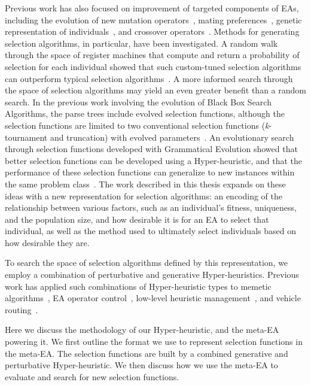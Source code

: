 \documentclass[times,12pt,titlepage]{mstogs}
\begin{document}
\begin{ThesisBody}
Previous work has also focused on improvement of targeted components of EAs, including the evolution of new mutation operators~\citep{woodward2012mutationGeneration, hong2013probMutation}, mating preferences~\citep{guntly2011limp}, genetic representation of individuals~\citep{scott2015geneticRepresentations}, and crossover operators~\citep{goldman2011scc}. Methods for generating selection algorithms, in particular, have been investigated. A random walk through the space of register machines that compute and return a probability of selection for each individual showed that such custom-tuned selection algorithms can outperform typical selection algorithms~\citep{woodward2011selection}. A more informed search through the space of selection algorithms may yield an even greater benefit than a random search. In the previous work involving the evolution of Black Box Search Algorithms, the parse trees include evolved selection functions, although the selection functions are limited to two conventional selection functions (\textit{k}-tournament and truncation) with evolved parameters~\citep{martin2013evolvingBBSA}. An evolutionary search through selection functions developed with Grammatical Evolution showed that better selection functions can be developed using a Hyper-heuristic, and that the performance of these selection functions can generalize to new instances within the same problem class~\citep{lourencco2013selection}. The work described in this thesis expands on these ideas with a new representation for selection algorithms: an encoding of the relationship between various factors, such as an individual's fitness, uniqueness, and the population size, and how desirable it is for an EA to select that individual, as well as the method used to ultimately select individuals based on how desirable they are. 

To search the space of selection algorithms defined by this representation, we employ a combination of perturbative and generative Hyper-heuristics. Previous work has applied such combinations of Hyper-heuristic types to memetic algorithms~\citep{krasnogor2004memetic}, EA operator control~\citep{maturana2010autonomous}, low-level heuristic management~\citep{remde2012empirical}, and vehicle routing~\citep{garrido2010vehicleRouting}. 

\label{Methodology}

Here we discuss the methodology of our Hyper-heuristic, and the meta-EA powering it. We first outline the format we use to represent selection functions in the meta-EA. The selection functions are built by a combined generative and perturbative Hyper-heuristic. We then discuss how we use the meta-EA to evaluate and search for new selection functions. 


\end{ThesisBody}
\end{document}
